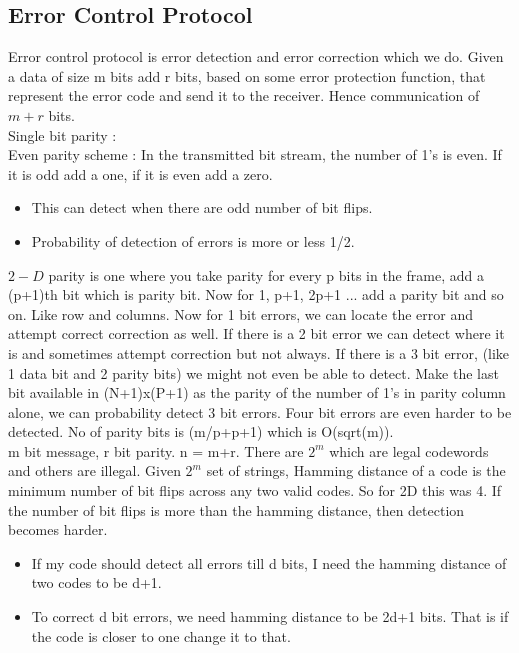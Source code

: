 \documentclass[solution,addpoints,12pt]{exam}
\begin{document}
\subsection{Error Control Protocol}
Error control protocol is error detection and error correction which we do.
Given a data of size m bits add r bits, based on some
error protection function, that represent the error code and
send it to the receiver. Hence communication of $m+r$ bits.\\
Single bit parity :\\
Even parity scheme : In the transmitted bit stream,
the number of 1's is even. If it is odd add a one, if it is
even add a zero.\\
\begin{itemize}
\item This can detect when there are odd number of bit flips.
\item Probability of detection of errors is more or less 1/2.\\
\end{itemize}

$2-D$ parity is one where you take parity for every p bits
in the frame, add a (p+1)th bit which is parity bit. Now
for 1, p+1, 2p+1 ... add a parity bit and so on. Like row
and columns. Now for 1 bit errors,
we can locate the error and attempt correct correction as well.
If there is a 2 bit error we can detect where it is and sometimes
attempt correction but not always. If there is a 3 bit error,
(like 1 data bit and 2 parity bits) we might not even be
able to detect. Make the last bit available in (N+1)x(P+1)
as the parity of the number of 1's in parity column alone,
we can probability detect 3 bit errors. Four bit errors
are even harder to be detected. No of parity bits
is (m/p+p+1) which is O(sqrt(m)).\\

m bit message, r bit parity.
n = m+r. There are $2^{m}$ which are legal codewords
and others are illegal. Given $2^m$ set of strings, Hamming distance
of a code is the minimum number of bit flips across any two
valid codes. So for 2D this was 4. If the number
of bit flips is more than the hamming distance, then detection becomes
harder.\\

\begin{itemize}
\item If my code should detect all errors till d bits, I need
the hamming distance of two codes to be d+1.
\item To correct d bit errors, we need hamming distance to be 2d+1 bits.
That is if the code is closer to one change it to that.
\end{itemize}
\end{document}
